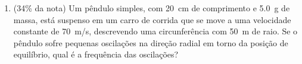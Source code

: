 \documentclass[12pt,a4paper,brazilian, fleqn]{article}
\newcommand{\ratio}[1]{(#1\% da nota)}
\begin{document}
\begin{enumerate}
    \item \ratio{34} Um pêndulo simples, com \SI{20}{cm} de comprimento e \SI{5.0}{g} de massa, está suspenso
        em um carro de corrida que se move a uma velocidade constante de \SI{70}{m/s}, descrevendo
        uma circunferência com \SI{50}{m} de raio. Se o pêndulo sofre pequenas oscilações na direção
        radial em torno da posição de equilíbrio, qual é a frequência das oscilações?
\end{enumerate}
\end{document}
